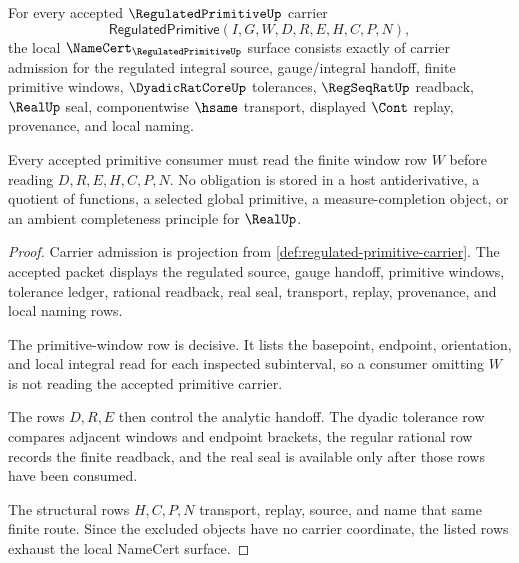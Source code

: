 \begin{theorem}
\label{thm:regulated-primitive-namecert-obligations}
For every accepted $\RegulatedPrimitiveUp$ carrier
$$
\mathsf{RegulatedPrimitive}(I,G,W,D,R,E,H,C,P,N),
$$
the local $\NameCert_{\RegulatedPrimitiveUp}$ surface consists exactly of carrier admission for the regulated integral source, gauge/integral handoff, finite primitive windows, $\DyadicRatCoreUp$ tolerances, $\RegSeqRatUp$ readback, $\RealUp$ seal, componentwise $\hsame$ transport, displayed $\Cont$ replay, provenance, and local naming.

Every accepted primitive consumer must read the finite window row $W$ before reading $D,R,E,H,C,P,N$. No obligation is stored in a host antiderivative, a quotient of functions, a selected global primitive, a measure-completion object, or an ambient completeness principle for $\RealUp$.
\end{theorem}
\begin{proof}
Carrier admission is projection from \autoref{def:regulated-primitive-carrier}. The accepted packet displays the regulated source, gauge handoff, primitive windows, tolerance ledger, rational readback, real seal, transport, replay, provenance, and local naming rows.

The primitive-window row is decisive. It lists the basepoint, endpoint, orientation, and local integral read for each inspected subinterval, so a consumer omitting $W$ is not reading the accepted primitive carrier.

The rows $D,R,E$ then control the analytic handoff. The dyadic tolerance row compares adjacent windows and endpoint brackets, the regular rational row records the finite readback, and the real seal is available only after those rows have been consumed.

The structural rows $H,C,P,N$ transport, replay, source, and name that same finite route. Since the excluded objects have no carrier coordinate, the listed rows exhaust the local NameCert surface.
\end{proof}

